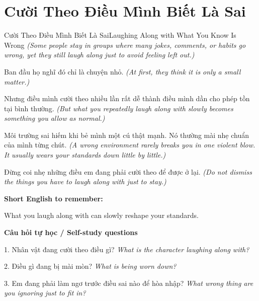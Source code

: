 \section{Cười Theo Điều Mình Biết Là Sai}
\begin{truyen}{Cười Theo Điều Mình Biết Là Sai}{Laughing Along with What You Know Is Wrong}
\textit{(Some people stay in groups where many jokes, comments, or habits go wrong, yet they still laugh along just to avoid feeling left out.)}

Ban đầu họ nghĩ đó chỉ là chuyện nhỏ.
\textit{(At first, they think it is only a small matter.)}

Nhưng điều mình cười theo nhiều lần rất dễ thành điều mình dần cho phép tồn tại bình thường.
\textit{(But what you repeatedly laugh along with slowly becomes something you allow as normal.)}

Môi trường sai hiếm khi bẻ mình một cú thật mạnh. Nó thường mài nhẹ chuẩn của mình từng chút.
\textit{(A wrong environment rarely breaks you in one violent blow. It usually wears your standards down little by little.)}

\end{truyen}

\begin{baihoc}
Đừng coi nhẹ những điều em đang phải cười theo để được ở lại.
\textit{(Do not dismiss the things you have to laugh along with just to stay.)}
\end{baihoc}

\begin{ghinhoanh}
\textbf{Short English to remember:}

What you laugh along with can slowly reshape your standards.

\end{ghinhoanh}

\begin{tuhocnhanh}
\textbf{Câu hỏi tự học / Self-study questions}

1. Nhân vật đang cười theo điều gì? \textit{What is the character laughing along with?}

2. Điều gì đang bị mài mòn? \textit{What is being worn down?}

3. Em đang phải làm ngơ trước điều sai nào để hòa nhập? \textit{What wrong thing are you ignoring just to fit in?}
\end{tuhocnhanh}
\ngancach

